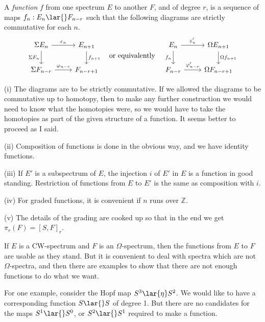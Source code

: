 \documentclass[../main]{subfiles}
\begin{document}
A \emph{function} $f$ from one spectrum $E$ to another $F$, and of degree $r$, is a sequence of maps $f_n: E_n\lar{} F_{n-r}$ such that the following diagrams are strictly commutative for each $n$.
\[
\begin{tikzcd}
	{\Sigma   E_n} & {E_{n+1}} \\
	{\Sigma   F_{n-r}} & {F_{n-r+1}}
	\arrow["{\varepsilon_n}", from=1-1, to=1-2]
	\arrow["{f_{n+1}}", from=1-2, to=2-2]
	\arrow["{\Sigma   F_n}"', from=1-1, to=2-1]
	\arrow["{\varphi_{n-r}}", from=2-1, to=2-2]
\end{tikzcd}
\quad \text{or equivalently} \quad
\begin{tikzcd}
	{E_n} & {\Omega E_{n+1}} \\
	{F_{n-r}} & {\Omega F_{n-r+1}}
	\arrow["{\varepsilon_n'}", from=1-1, to=1-2]
	\arrow["{\Omega f_{n+1}}", from=1-2, to=2-2]
	\arrow["{f_n}"', from=1-1, to=2-1]
	\arrow["{\varphi_{n-r}'}", from=2-1, to=2-2]
\end{tikzcd}
\]
\begin{notes}
\item[(i)]   The diagrams are to be strictly commutative. If we allowed the diagrams to be commutative up to homotopy, then to make any further construction we would need to know what the homotopies were, so we would have to take the homotopies as part of the given structure of a function. It seems better to proceed as I said.
\item[(ii)]  Composition of functions is done in the obvious way, and we have identity functions.
\item[(iii)] If $E'$ is a subspectrum of $E$, the injection $i$ of $E'$ in $E$ is a function in good standing. Restriction of functions from $E$ to $E'$ is the same as composition with $i$.
\item[(iv)]  For graded functions, it is convenient if $n$ runs over $\mathbb Z$.
\item[(v)]   The details of the grading are cooked up so that in the end we get $\pi_r(F)=[S,F]_r$.
\end{notes}

If $E$ is a CW-spectrum and $F$ is an $\Omega$-spectrum, then the functions from $E$ to $F$ are usable as they stand. But it is convenient to deal with spectra which are not $\Omega$-spectra, and then there are examples to show that there are not enough functions to do what we want.

For one example, consider the Hopf map $S^3\lar{\eta}S^2$. We would like to have a corresponding function $S\lar{} S$ of degree 1. But there are no candidates for the maps $S^1\lar{} S^0$, or $S^2\lar{} S^1$ required to make a function.
\end{document}
